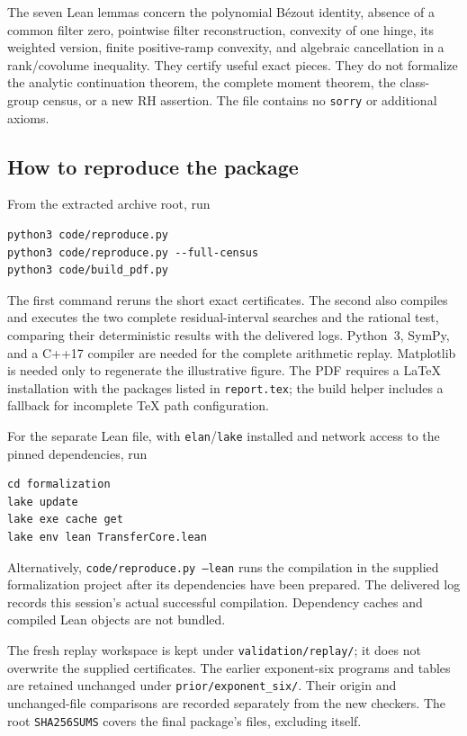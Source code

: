 The seven Lean lemmas concern the polynomial B\'ezout identity, absence of a common filter zero, pointwise filter reconstruction, convexity of one hinge, its weighted version, finite positive-ramp convexity, and algebraic cancellation in a rank/covolume inequality. They certify useful exact pieces. They do not formalize the analytic continuation theorem, the complete moment theorem, the class-group census, or a new RH assertion. The file contains no \texttt{sorry} or additional axioms.

\subsection{How to reproduce the package}

From the extracted archive root, run
\begin{verbatim}
python3 code/reproduce.py
python3 code/reproduce.py --full-census
python3 code/build_pdf.py
\end{verbatim}
The first command reruns the short exact certificates. The second also compiles and executes the two complete residual-interval searches and the rational test, comparing their deterministic results with the delivered logs. Python~3, SymPy, and a C++17 compiler are needed for the complete arithmetic replay. Matplotlib is needed only to regenerate the illustrative figure. The PDF requires a LaTeX installation with the packages listed in \texttt{report.tex}; the build helper includes a fallback for incomplete TeX path configuration.

For the separate Lean file, with \texttt{elan}/\texttt{lake} installed and network access to the pinned dependencies, run
\begin{verbatim}
cd formalization
lake update
lake exe cache get
lake env lean TransferCore.lean
\end{verbatim}
Alternatively, \texttt{code/reproduce.py --lean} runs the compilation in the supplied formalization project after its dependencies have been prepared. The delivered log records this session's actual successful compilation. Dependency caches and compiled Lean objects are not bundled.

The fresh replay workspace is kept under \texttt{validation/replay/}; it does not overwrite the supplied certificates. The earlier exponent-six programs and tables are retained unchanged under \texttt{prior/exponent\_six/}. Their origin and unchanged-file comparisons are recorded separately from the new checkers. The root \texttt{SHA256SUMS} covers the final package's files, excluding itself.

